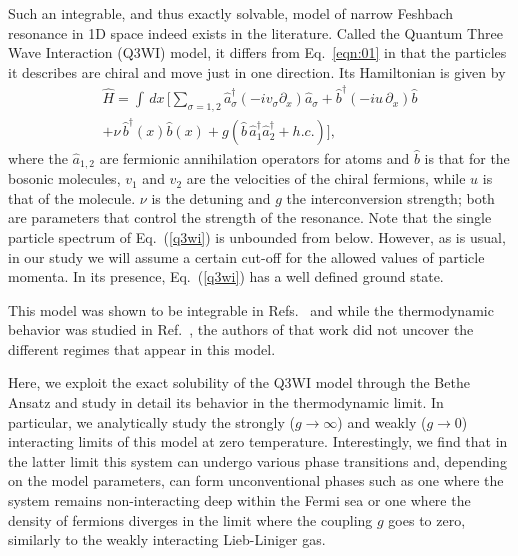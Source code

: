 \documentclass[aps,pra,
superscriptaddress,
reprint,twocolumn,preprintnumbers,
amsmath,amssymb,
nofootinbib]{revtex4-1}
\def\rf#1{(\ref{#1})}
\begin{document}
Such an integrable, and thus exactly solvable, model of narrow Feshbach resonance in 1D space indeed exists in the literature. Called the 
Quantum Three Wave Interaction (Q3WI) model, it differs from Eq.~\eqref{eqn:01} in that the particles it describes are chiral and move just in one direction. Its Hamiltonian is given by
 \begin{multline}
	\label{q3wi}	
	\hat{H} = \int\,dx \, \Bigg[\sum\limits_{\sigma=1,2} \hat{a}^{\dagger}_{\sigma} \left(-i v_{\sigma} \partial_x \right) \hat{a}_{\sigma} + \hat{b}^{\dagger} \left(-i u \, \partial_x \right) \hat{b}\\ + \nu\,  \hat{b}^\dagger(x) \hat{b}(x) + g \left(\hat{b} \, \hat{a}^{\dagger}_{1} \hat{a}^{\dagger}_{2} + h.c.  \right) \Bigg],
	\end{multline}
where the $\hat{a}_{1,2}$ are fermionic annihilation operators for atoms and $\hat{b}$ is that for the bosonic molecules, $v_1$ and $v_2$ are the velocities of the chiral fermions, while $u$ is that of the molecule. $\nu$ is the detuning and $g$ the interconversion strength; both are parameters that control the strength of the resonance. Note that the single particle spectrum of Eq.~\rf{q3wi} is unbounded from below. However, as is usual, in our study we will assume a certain cut-off for the allowed values of particle momenta. In its presence, Eq.~\rf{q3wi} has a well defined ground state.

This model was shown to be integrable in Refs.~\cite{Wadati1984a,Wadati1984b} and while the thermodynamic behavior was studied in Ref.~\cite{Ohkuma1985}, the authors of that work did not uncover the different regimes that appear in this model.

Here, we exploit the exact solubility of the Q3WI model through the Bethe Ansatz and study in detail its behavior in the thermodynamic limit. In particular, we analytically study the strongly ($g \to \infty$) and weakly ($g \to 0$) interacting limits of this model at zero temperature. 
Interestingly, we find that in the latter limit this system can undergo various phase transitions and, depending on the model parameters, can form unconventional phases such as one where the system remains non-interacting deep within the Fermi sea or one where the density of fermions diverges in the limit where the coupling $g$ goes to zero,
similarly to the weakly
interacting Lieb-Liniger gas. 
\end{document}
